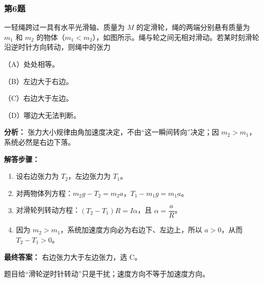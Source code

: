 \documentclass[12pt,a4paper]{ctexart}
\begin{document}
\subsubsection*{第6题}
\begin{tcolorbox}[colback=gray!2!white,colframe=black!60,title={题目}]
一轻绳跨过一具有水平光滑轴、质量为 \(M\) 的定滑轮，绳的两端分别悬有质量为 \(m_1\) 和 \(m_2\) 的物体（\(m_1<m_2\)），如图所示。绳与轮之间无相对滑动。若某时刻滑轮沿逆时针方向转动，则绳中的张力\par
（A）处处相等。\par
（B）左边大于右边。\par
（C）右边大于左边。\par
（D）哪边大无法判断。\par
\end{tcolorbox}
\begin{tcolorbox}[colback=blue!2!white,colframe=blue!55!black,title={完整答案}]
\textbf{分析：}
张力大小规律由角加速度决定，不由“这一瞬间转向”决定；因 \(m_2>m_1\)，系统必然是右边下落。\par
\textbf{解答步骤：}
\begin{enumerate}
\item 设右边张力为 \(T_2\)，左边张力为 \(T_1\)。
\item 对两物体列方程：\(m_2g-T_2=m_2a\)，\(T_1-m_1g=m_1a\)。
\item 对滑轮列转动方程：\((T_2-T_1)R=I\alpha\)，且 \(\alpha=\dfrac{a}{R}\)。
\item 因为 \(m_2>m_1\)，系统加速度方向必为右边下、左边上，所以 \(a>0\)，从而 \(T_2-T_1>0\)。
\end{enumerate}
\textbf{最终答案：}
右边张力大于左边张力，选 C。\par
\end{tcolorbox}
\begin{tcolorbox}[colback=red!2!white,colframe=red!55!black,title={易错点}]
题目给“滑轮逆时针转动”只是干扰；速度方向不等于加速度方向。\par
\end{tcolorbox}
\end{document}
